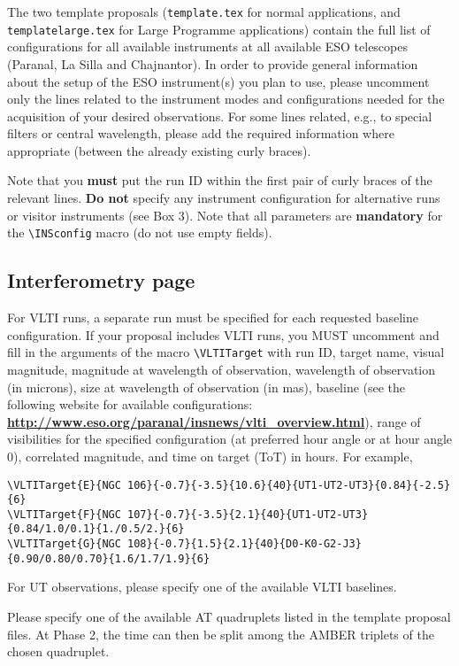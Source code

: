 \documentclass{article}
\begin{document}
The two template proposals ({\tt template.tex} for normal
applications, 
and {\tt templatelarge.tex} for Large Programme applications) contain
the full list of configurations for all available instruments at all
available ESO telescopes (Paranal, La Silla and Chajnantor).  In order
to provide 
general information about the setup of the ESO instrument(s) you plan
to use, please uncomment only the lines related to the instrument
modes and configurations needed for the acquisition of your desired
observations.  For some lines related, e.g., to special filters or
central wavelength, please add the required information where
appropriate (between the already existing curly
braces).

Note that you {\bf must} put the run ID within the first pair of curly
braces of the relevant lines. {\bf Do not} specify any instrument
configuration for alternative runs or visitor instruments (see Box 3). 
Note
that all parameters are {\bf mandatory} for the \verb|\INSconfig|
macro (do not use empty fields).

\subsection{Interferometry page}
\label{sec:vlti}

For VLTI runs, a separate run must be specified for each requested baseline configuration.
If your proposal includes VLTI runs, you MUST uncomment and fill in the arguments of the 
macro \verb|\VLTITarget| with run ID, target name, visual
magnitude, magnitude at wavelength of observation, wavelength of
observation (in microns), size at wavelength of observation (in mas),
baseline (see the following website for available configurations:
\href{http://www.eso.org/paranal/insnews/vlti_overview.html}{\bf
  \underline{http://www.eso.org/paranal/insnews/vlti\_overview.html}}), 
range of visibilities for the specified
configuration (at preferred hour angle or at hour angle 0), correlated
magnitude, and time on target (ToT) in hours. For example,
\begin{verbatim}
\VLTITarget{E}{NGC 106}{-0.7}{-3.5}{10.6}{40}{UT1-UT2-UT3}{0.84}{-2.5}{6}
\VLTITarget{F}{NGC 107}{-0.7}{-3.5}{2.1}{40}{UT1-UT2-UT3}{0.84/1.0/0.1}{1./0.5/2.}{6}
\VLTITarget{G}{NGC 108}{-0.7}{1.5}{2.1}{40}{D0-K0-G2-J3}{0.90/0.80/0.70}{1.6/1.7/1.9}{6}
\end{verbatim}


For UT observations, please specify one of the available VLTI baselines.

Please specify one of the available AT quadruplets listed in the
template proposal files. At Phase 2, the time can then be split
among the AMBER triplets of the chosen quadruplet.
\end{document}
